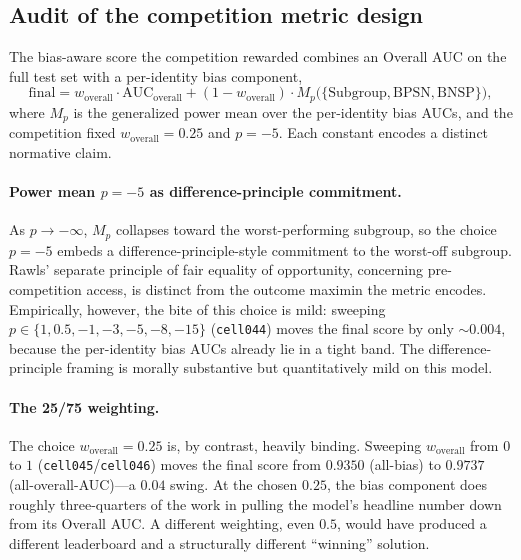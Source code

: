 \documentclass[11pt]{article}
\begin{document}
\subsection{Audit of the competition metric design}

The bias-aware score the competition rewarded combines an Overall AUC on the full test set with a per-identity bias component,
\[
\mathrm{final} = w_{\mathrm{overall}} \cdot \mathrm{AUC}_{\mathrm{overall}} + (1 - w_{\mathrm{overall}}) \cdot M_p\big(\{\mathrm{Subgroup}, \mathrm{BPSN}, \mathrm{BNSP}\}\big),
\]
where $M_p$ is the generalized power mean over the per-identity bias AUCs, and the competition fixed $w_{\mathrm{overall}} = 0.25$ and $p = -5$. Each constant encodes a distinct normative claim.

\paragraph{Power mean $p = -5$ as difference-principle commitment.} As $p \to -\infty$, $M_p$ collapses toward the worst-performing subgroup, so the choice $p = -5$ embeds a difference-principle-style commitment to the worst-off subgroup. Rawls' separate principle of fair equality of opportunity, concerning pre-competition access, is distinct from the outcome maximin the metric encodes. Empirically, however, the bite of this choice is mild: sweeping $p \in \{1, 0.5, -1, -3, -5, -8, -15\}$ (\texttt{cell044}) moves the final score by only $\sim 0.004$, because the per-identity bias AUCs already lie in a tight band. The difference-principle framing is morally substantive but quantitatively mild on this model.

\paragraph{The 25/75 weighting.} The choice $w_{\mathrm{overall}} = 0.25$ is, by contrast, heavily binding. Sweeping $w_{\mathrm{overall}}$ from $0$ to $1$ (\texttt{cell045}/\texttt{cell046}) moves the final score from $0.9350$ (all-bias) to $0.9737$ (all-overall-AUC)---a $0.04$ swing. At the chosen $0.25$, the bias component does roughly three-quarters of the work in pulling the model's headline number down from its Overall AUC. A different weighting, even $0.5$, would have produced a different leaderboard and a structurally different ``winning'' solution.
\end{document}
